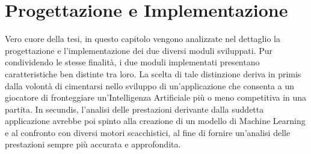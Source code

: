 \chapter{Progettazione e Implementazione}
\label{cap: design}
%

\begin{citazione}
Vero cuore della tesi, in questo capitolo vengono analizzate nel dettaglio la progettazione e l'implementazione dei due diversi moduli sviluppati. Pur condividendo le stesse finalità, i due moduli implementati presentano caratteristiche ben distinte tra loro. La scelta di tale distinzione deriva in primis dalla volontà di cimentarsi nello sviluppo di un'applicazione che consenta a un giocatore di fronteggiare un'Intelligenza Artificiale più o meno competitiva in una partita. In secundis, l'analisi delle prestazioni derivante dalla suddetta applicazione avrebbe poi spinto alla creazione di un modello di Machine Learning e al confronto con diversi motori scacchistici, al fine di fornire un'analisi delle prestazioni sempre più accurata e approfondita.
\end{citazione}


